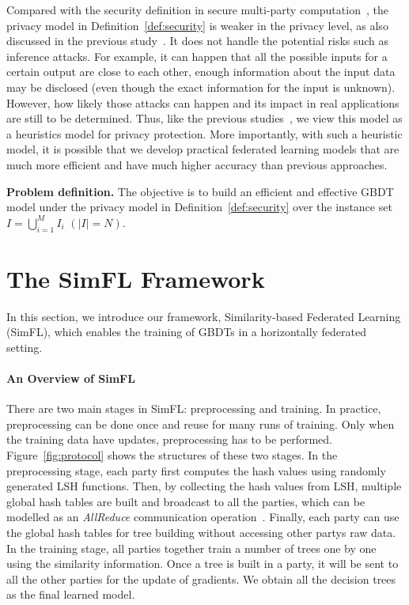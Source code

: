 \documentclass[letterpaper]{article} %
\theoremstyle{definition}
\begin{document}
Compared with the security definition in secure multi-party computation~\cite{yao1982protocols}, the privacy model in Definition~\ref{def:security} is weaker in the privacy level, as also discussed in the previous study~\cite{du2004privacy}. It does not handle the potential risks such as inference attacks. For example, it can happen that all the possible inputs for a certain output are close to each other, enough information about the input data may be disclosed (even though the exact information for the input is unknown). However, how likely those attacks can happen and its impact in real applications are still to be determined. Thus, like the previous studies~\cite{du2004privacy,liu2018secure}, we view this model as a heuristics model for privacy protection. More importantly, with such a heuristic model, it is possible that we develop practical federated learning models that are much more efficient and have much higher accuracy than previous approaches.

{\bf Problem definition.} The objective is to build an efficient and effective GBDT model under the privacy model in Definition~\ref{def:security} over the instance set $I = \bigcup_{i=1}^MI_i$ $(|I|=N)$.

\section{The SimFL Framework}
In this section, we introduce our framework, Similarity-based Federated Learning (SimFL), which enables the training of GBDTs in a horizontally federated setting.

\paragraph{An Overview of SimFL}
There are two main stages in SimFL: preprocessing and training. In practice, preprocessing can be done once and reuse for many runs of training. Only when the training data have updates, preprocessing has to be performed. Figure~\ref{fig:protocol} shows the structures of these two stages. 
In the preprocessing stage, each party first computes the hash values using randomly generated LSH functions. Then, by collecting the hash values from LSH, multiple global hash tables are built and broadcast to all the parties, which can be modelled as an \emph{AllReduce} communication operation~\cite{patarasuk2009bandwidth}. Finally, each party can use the global hash tables for tree building without accessing other partys raw data.
In the training stage, all parties together train a number of trees one by one using the similarity information. Once a tree is built in a party, it will be sent to all the other parties for the update of gradients. We obtain all the decision trees as the final learned model. 
\end{document}
